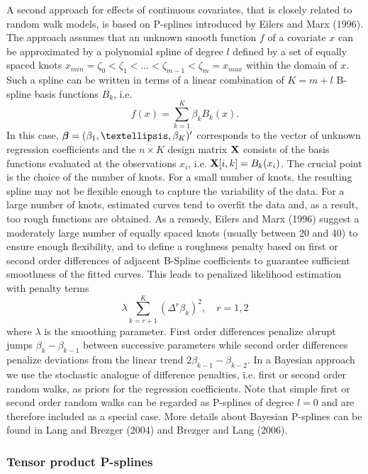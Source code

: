 \documentclass[11pt,a4paper,twoside]{bayesxarticle}
\begin{document}
A second approach for effects of continuous covariates, that is
closely related to random walk models, is based on P-splines
introduced by Eilers and Marx (1996). The approach assumes that an
unknown smooth function $f$ of a covariate $x$ can be approximated
by a polynomial spline of degree $l$ defined by a set of equally
spaced knots $x_{min} = \zeta_{0}  < \zeta_{1} < \dots < \zeta_{m-1}
< \zeta_{m} = x_{max}$ within the domain of $x$. Such a spline can
be written in terms of a linear combination of $K = m+l$ B-spline
basis functions $B_{k}$, i.e.
$$
f(x) = \sum_{k=1}^{K} \beta_{k} B_{k}(x).
$$
In this case, $\betavec = (\beta_{1},\dots,\beta_{K})'$
corresponds to the vector of unknown regression coefficients and the
$n \times K$ design matrix $\mathbf{X}$ consists of the basis functions
evaluated at the observations $x_{i}$, i.e. $\mathbf{X}[i,k] =
B_k(x_{i})$. The crucial point is the choice of the number of
knots. For a small number of knots, the resulting spline may not be
flexible enough to capture the variability of the data. For a large
number of knots, estimated curves tend to overfit the data and, as a
result, too rough functions are obtained. As a remedy, Eilers and
Marx (1996) suggest a moderately large number of equally spaced
knots (usually between 20 and 40) to ensure enough flexibility, and
to define a roughness penalty based on first or second order
differences of adjacent B-Spline coefficients to guarantee
sufficient smoothness of the fitted curves. This leads to penalized
likelihood estimation with penalty terms
\begin{equation}
\label{diffpenalty} \lambda \sum_{k=r+1}^{K}
(\Delta^r \beta_{k})^2 , \quad r=1,2
\end{equation}
where $\lambda$ is the smoothing parameter. First order
differences penalize abrupt jumps $\beta_{k}-\beta_{k-1}$ between
successive parameters while second order differences penalize
deviations from the linear trend $2 \beta_{k-1}-\beta_{k-2}$. In
a Bayesian approach we use the stochastic analogue of difference
penalties, i.e. first or second order random walks, as priors for
the regression coefficients. Note that simple first or second order
random walks can be regarded as P-splines of degree $l=0$ and are
therefore included as a special case. More details about Bayesian
P-splines can be found in Lang and Brezger (2004) and Brezger and
Lang (2006).

\subsubsection{Tensor product P-splines}
\label{tensorproductpsplines_bayes}
\end{document}

